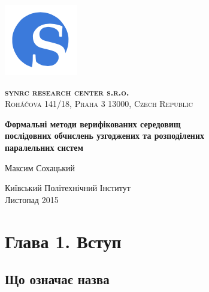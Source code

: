 \documentclass[11pt,oneside]{article}
\begin{document}
\thispagestyle{empty}
\begin{center}

\begin{minipage}[t]{2cm}
    \includegraphics[scale=0.4]{img/S}
\end{minipage}
\begin{minipage}[t]{12cm}
    \begin{flushright}
        \textsc{{\Large {\bf {\color{Blue}syn}{\color{OrangeRed}rc} research center s.r.o.}}}\\
        \textsc{Roháčova 141/18, Praha 3 13000, Czech Republic}\\
    \end{flushright}
\end{minipage}

\vspace{3cm}

    \vspace{3cm}   {\Large \bf Формальні методи верифікованих середовищ \\послідовних обчислень узгоджених та розподілених \\паралельних систем\par}
    \vspace{3cm}   {\Large Максим Сохацький\par}
    \vspace{6cm}   {\Large Київський Політехнічний Інститут\\}
    \vspace{0.3cm} {\Large Листопад 2015}
\end{center}

\vspace{2cm}
\newpage
\section{Глава 1. Вступ}

\vspace{1cm}

\subsection{Що означає назва}
\end{document}
